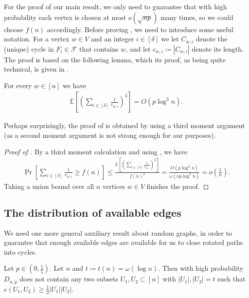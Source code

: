 \documentclass{article}
\begin{document}
	For the proof of our main result, we only need to guarantee that with high probability each vertex is chosen at most $o\left(\sqrt{np} \right)$ many times, so we could choose $f(n)$ accordingly.
	Before proving , we need to introduce some useful notation.
	For a vertex $w \in V$ and an integer $i \in [\delta]$ we let $C_{w,i}$ denote the (unique) cycle in $F_i \in \mathcal F$ that contains $w$, and let $c_{w,i} \coloneqq |C_{w,i}|$ denote its length.
	The proof is based on the following lemma, which its proof, as being quite technical, is given in .
	\begin{lemma}
		\label{lem:moment}
		For every $w \in [n]$ we have
		\begin{align*}
		\mathbb E \left[\left(\sum_{i \in [\delta]} \frac{1}{c_{w,i}} \right)^3 \right] = O\left(p \log^3 n \right).
		\end{align*}
	\end{lemma}
	
	Perhaps surprisingly, the proof of  is obtained by using a third moment argument (as a second moment argument is not strong enough for our purposes).
	
	\begin{proof}[Proof of ]
		By a third moment calculation and using , we have
		\begin{align*}
		\Pr \left[\sum_{i \in [\delta]} \frac{1}{c_{w,i}} \ge f(n) \right] \le \frac{\mathbb E \left[\left(\sum_{i\in [\delta]}\frac{1}{c_{w,i}} \right)^3 \right]}{f(n)^3}
		= \frac{O\left(p\log^3 n \right)}{\omega \left(np \log^3 n \right)}
		= o\left(\frac{1}{n} \right).
		\end{align*}
		Taking a union bound over all $n$ vertices $w \in V$ finishes the proof.
	\end{proof}
	
	
	\subsection{The distribution of available edges}
	We need one more general auxiliary result about random graphs, in order to guarantee that enough available edges are available for us to close rotated paths into cycles.
	
	\begin{proposition}
		\label{prop:nonedges}
		Let $p \in \left(0, \frac{1}{5} \right)$.
		Let $n$ and $t \coloneqq t(n) = \omega(\log n)$.
		Then with high probability $D_{n,p}$ does not contain any two subsets $U_1, U_2 \subset [n]$ with $|U_1|, |U_2| = t$ such that $e(U_1, U_2) \ge \frac{1}{2}|U_1||U_2|$.
	\end{proposition}
	
\end{document}
